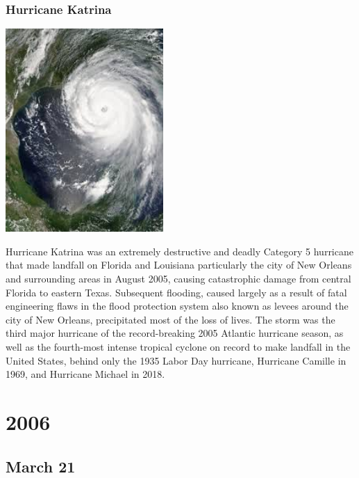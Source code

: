 \documentclass[11pt]{report}
\begin{document}
\subsection{Hurricane Katrina}
\vspace{2mm}\begin{center}\includegraphics[width=6cm]{./img/hurricaneKatrina.jpg}\end{center}
Hurricane Katrina was an extremely destructive and deadly Category 5 hurricane that made landfall on Florida and Louisiana particularly the city of New Orleans and surrounding areas in August 2005, causing catastrophic damage from central Florida to eastern Texas. Subsequent flooding, caused largely as a result of fatal engineering flaws in the flood protection system also known as levees around the city of New Orleans, precipitated most of the loss of lives. The storm was the third major hurricane of the record-breaking 2005 Atlantic hurricane season, as well as the fourth-most intense tropical cyclone on record to make landfall in the United States, behind only the 1935 Labor Day hurricane, Hurricane Camille in 1969, and Hurricane Michael in 2018.

\chapter{2006}
\section{March 21}
\end{document}

